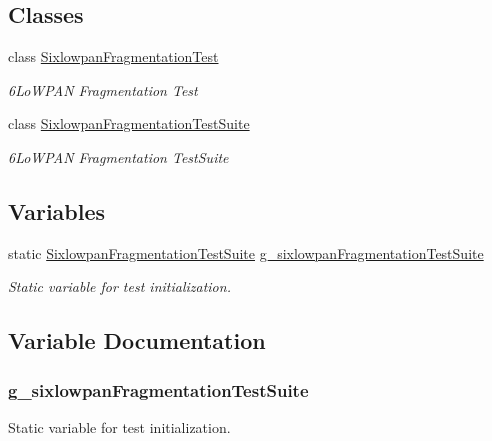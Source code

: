 \subsection*{Classes}
\begin{DoxyCompactItemize}
\item 
class \hyperlink{classSixlowpanFragmentationTest}{Sixlowpan\+Fragmentation\+Test}
\begin{DoxyCompactList}\small\item\em 6\+Lo\+W\+P\+AN Fragmentation Test \end{DoxyCompactList}\item 
class \hyperlink{classSixlowpanFragmentationTestSuite}{Sixlowpan\+Fragmentation\+Test\+Suite}
\begin{DoxyCompactList}\small\item\em 6\+Lo\+W\+P\+AN Fragmentation Test\+Suite \end{DoxyCompactList}\end{DoxyCompactItemize}
\subsection*{Variables}
\begin{DoxyCompactItemize}
\item 
static \hyperlink{classSixlowpanFragmentationTestSuite}{Sixlowpan\+Fragmentation\+Test\+Suite} \hyperlink{sixlowpan-fragmentation-test_8cc_a66b71012fdf19f42de3e77c4d4d39f94}{g\+\_\+sixlowpan\+Fragmentation\+Test\+Suite}
\begin{DoxyCompactList}\small\item\em Static variable for test initialization. \end{DoxyCompactList}\end{DoxyCompactItemize}


\subsection{Variable Documentation}
\subsubsection[{\texorpdfstring{g\+\_\+sixlowpan\+Fragmentation\+Test\+Suite}{g_sixlowpanFragmentationTestSuite}}]{ g\+\_\+sixlowpan\+Fragmentation\+Test\+Suite\hspace{0.3cm}{\ttfamily [static]}}\hypertarget{sixlowpan-fragmentation-test_8cc_a66b71012fdf19f42de3e77c4d4d39f94}{}\label{sixlowpan-fragmentation-test_8cc_a66b71012fdf19f42de3e77c4d4d39f94}


Static variable for test initialization. 


